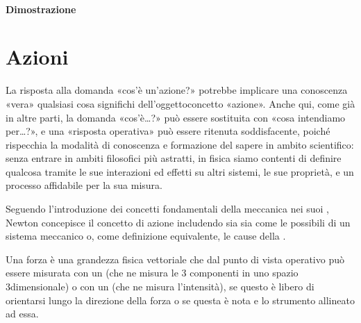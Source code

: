 \documentclass[letterpaper,10pt,italian]{jupyterBook}
\begin{document}
\subsubsection*{Dimostrazione}

\sphinxstepscope




\chapter{Azioni}
\label{\detokenize{ch/mechanics/actions:azioni}}\label{\detokenize{ch/mechanics/actions:physics-hs-mechanics-actions}}\label{\detokenize{ch/mechanics/actions::doc}}
\sphinxAtStartPar
{}%
\begin{footnote}[1]\sphinxAtStartFootnote
La risposta alla domanda «cos’è un’azione?» potrebbe implicare una conoscenza «vera» \sphinxhyphen{} qualsiasi cosa significhi \sphinxhyphen{} dell’oggetto\sphinxhyphen{}concetto «azione». Anche qui, come già in altre parti, la domanda «cos’è…?» può essere sostituita con «cosa intendiamo per…?», e una «risposta operativa» può essere ritenuta soddisfacente, poiché rispecchia la modalità di conoscenza e formazione del sapere in ambito scientifico: senza entrare in ambiti filosofici più astratti, in fisica siamo contenti di definire qualcosa tramite le sue interazioni ed effetti su altri sistemi, le sue proprietà, e un processo affidabile per la sua misura.
%
\end{footnote} Seguendo l’introduzione dei concetti fondamentali della meccanica nei suoi , Newton concepisce il concetto di azione \sphinxhyphen{} includendo sia  sia  \sphinxhyphen{} come le possibili  di un sistema meccanico o, come definizione equivalente, le cause della .

\sphinxAtStartPar
Una forza è una grandezza fisica vettoriale che dal punto di vista operativo può essere misurata con un  (che ne misura le 3 componenti in uno spazio 3\sphinxhyphen{}dimensionale) o con un  (che ne misura l’intensità), se questo è libero di orientarsi lungo la direzione della forza o se questa è nota e lo strumento allineato ad essa.
\end{document}
